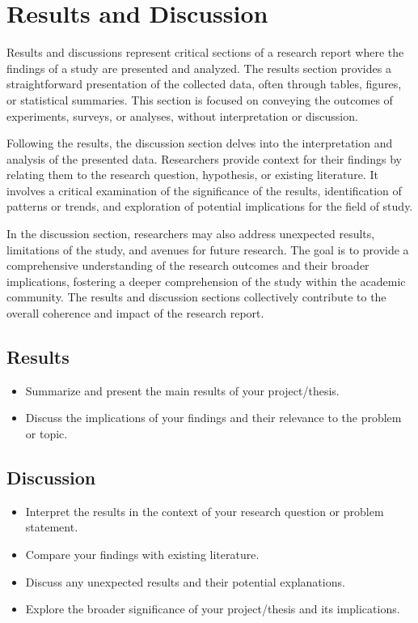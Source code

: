 \chapter{Results and Discussion}

Results and discussions represent critical sections of a research report where the findings of a study are presented and analyzed. The results section provides a straightforward presentation of the collected data, often through tables, figures, or statistical summaries. This section is focused on conveying the outcomes of experiments, surveys, or analyses, without interpretation or discussion.

Following the results, the discussion section delves into the interpretation and analysis of the presented data. Researchers provide context for their findings by relating them to the research question, hypothesis, or existing literature. It involves a critical examination of the significance of the results, identification of patterns or trends, and exploration of potential implications for the field of study.

In the discussion section, researchers may also address unexpected results, limitations of the study, and avenues for future research. The goal is to provide a comprehensive understanding of the research outcomes and their broader implications, fostering a deeper comprehension of the study within the academic community. The results and discussion sections collectively contribute to the overall coherence and impact of the research report.


\section{Results}
\begin{itemize}
    \item Summarize and present the main results of your project/thesis.
    \item Discuss the implications of your findings and their relevance to the problem or topic.
\end{itemize}

\section{Discussion}
\begin{itemize}
    \item Interpret the results in the context of your research question or problem statement.
    \item Compare your findings with existing literature.
    \item Discuss any unexpected results and their potential explanations.
    \item Explore the broader significance of your project/thesis and its implications.
\end{itemize}
